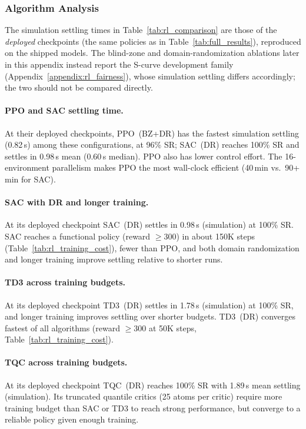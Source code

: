 \subsubsection{Algorithm Analysis}

The simulation settling times in Table~\ref{tab:rl_comparison} are those of
the \emph{deployed} checkpoints (the same policies as in
Table~\ref{tab:full_results}), reproduced on the shipped models. The
blind-zone and domain-randomization ablations later in this appendix instead
report the S-curve development family (Appendix~\ref{appendix:rl_fairness}),
whose simulation settling differs accordingly; the two should not be compared
directly.

\paragraph{PPO and SAC settling time.}
At their deployed checkpoints, PPO~(BZ+DR) has the fastest simulation
settling (0.82\,s) among these configurations, at 96\% SR; SAC~(DR)
reaches 100\% SR and settles in 0.98\,s mean (0.60\,s
median). PPO also has lower control effort. The 16-environment
parallelism makes PPO the most wall-clock efficient (40\,min vs.\
90+\,min for SAC).

\paragraph{SAC with DR and longer training.}
At its deployed checkpoint SAC~(DR) settles in 0.98\,s (simulation) at
100\% SR. SAC reaches a functional policy (reward $\geq 300$) in about
150K steps (Table~\ref{tab:rl_training_cost}), fewer than PPO, and both
domain randomization and longer training improve settling relative to
shorter runs.

\paragraph{TD3 across training budgets.}
At its deployed checkpoint TD3~(DR) settles in 1.78\,s (simulation) at
100\% SR, and longer training improves settling over shorter budgets.
TD3~(DR) converges fastest of all algorithms
(reward $\geq 300$ at 50K steps, Table~\ref{tab:rl_training_cost}).

\paragraph{TQC across training budgets.}
At its deployed checkpoint TQC~(DR) reaches 100\% SR with 1.89\,s mean
settling (simulation). Its truncated quantile critics (25 atoms per
critic) require more training budget than SAC or TD3 to reach strong
performance, but converge to a reliable policy given enough training.

